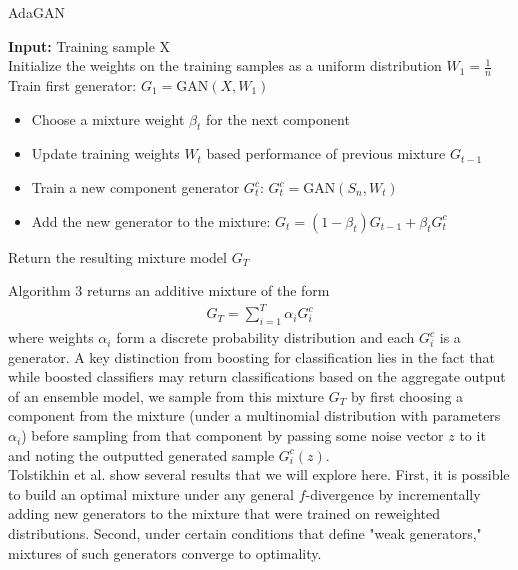 \documentclass[submission]{eptcs}
\begin{document}
\begin{algorithm}[H]
    \caption{AdaGAN}
    \begin{algorithmic}
        \State \textbf{Input:} Training sample X \\

        \State Initialize the weights on the training samples as a uniform distribution $W_1 = \frac{1}{n}$ \\

        \State Train first generator: $G_1 = \text{GAN}(X, W_1)$ \\

            \begin{itemize}
                \item Choose a mixture weight $\beta_t$ for the next component
                \item Update training weights $W_t$ based performance of previous mixture $G_{t-1}$
                \item Train a new component generator $G^c_t$: $G^c_t = \text{GAN}(S_n, W_t)$
                \item Add the new generator to the mixture: $G_t = (1 - \beta_t)G_{t-1} + \beta_tG^c_t$
            \end{itemize}
        \EndFor
        \State Return the resulting mixture model $G_T$
    \end{algorithmic}
\end{algorithm}

\noindent Algorithm 3 returns an additive mixture of the form
\begin{align}
    G_T = \sum_{i=1}^{T} \alpha_i G_i^c
\end{align}
where weights $\alpha_i$ form a discrete probability distribution and each $G_i^c$ is a generator. A key distinction from boosting for classification lies in the fact that while boosted classifiers may return classifications based on the aggregate output of an ensemble model, we sample from this mixture $G_T$ by first choosing a component from the mixture (under a multinomial distribution with parameters $\alpha_i$) before sampling from that component by passing some noise vector $z$ to it and noting the outputted generated sample $G_i^c(z)$. \\

Tolstikhin et al. show several results that we will explore here. First, it is possible to build an optimal mixture under any general $f$-divergence by incrementally adding new generators to the mixture that were trained on reweighted distributions. Second, under certain conditions that define "weak generators," mixtures of such generators converge to optimality. 
\end{document}
